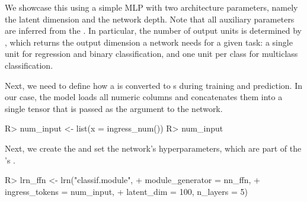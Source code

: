 \documentclass[article,shortnames]{jss}
\theoremstyle{definition}
\renewenvironment{CodeChunk}{\par\addvspace{0.6\baselineskip}\noindent\begin{minipage}{\linewidth}}{\end{minipage}\par\vspace{0.6\baselineskip}}
\begin{document}
We showcase this using a simple MLP with two architecture parameters, namely the latent dimension and the network depth.
Note that all auxiliary parameters are inferred from the .
In particular, the number of output units is determined by , which returns the output dimension a network needs for a given task: a single unit for regression and binary classification, and one unit per class for multiclass classification.

\begin{CodeChunk}
\end{CodeChunk}

Next, we need to define how a  is converted to s during training and prediction.
In our case, the model loads all numeric columns and concatenates them into a single tensor that is passed as the argument  to the network.

\begin{CodeChunk}
\begin{CodeInput}
R> num_input <- list(x = ingress_num())
R> num_input
\end{CodeInput}

\end{CodeChunk}

Next, we create the  and set the network's hyperparameters, which are part of the 's .

\begin{CodeChunk}
\begin{CodeInput}
R> lrn_ffn <- lrn("classif.module",
+    module_generator = nn_ffn,
+    ingress_tokens = num_input,
+    latent_dim = 100, n_layers = 5)
\end{CodeInput}
\end{CodeChunk}
\end{document}
